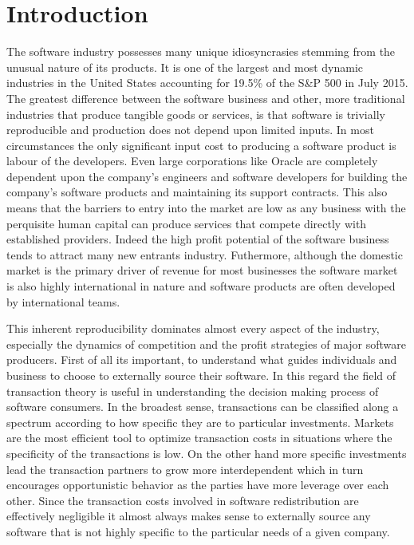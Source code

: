 \section*{Introduction}

The software industry possesses many unique idiosyncrasies stemming from the unusual nature of its products.
It is one of the largest and most dynamic industries in the United States accounting for 19.5\% of the S\&P 500 in July 2015.\autocite[6]{SurveysSoftware2015}
The greatest difference between the software business and other, more traditional industries that produce tangible goods or services, is that software is trivially reproducible and production does not depend upon limited inputs.\autocite[3]{buxmann2012software}
In most circumstances the only significant input cost to producing a software product is labour of the developers.
Even large corporations like Oracle are completely dependent upon the company's engineers and software developers for building the company's software products and maintaining its support contracts.\autocite[115]{finkle2012larry}
This also means that the barriers to entry into the market are low as any business with the perquisite human capital can produce services that compete directly with established providers.\autocite[115]{finkle2012larry}
Indeed the high profit potential of the software business tends to attract many new entrants industry.\autocite[116]{finkle2012larry}
Futhermore, although the domestic market is the primary driver of revenue for most businesses\autocite[]{ITSoftwareEconomist} the software market is also highly international in nature and software products are often developed by international teams.\autocite[3]{buxmann2012software}

This inherent reproducibility dominates almost every aspect of the industry, especially the dynamics of competition and the profit strategies of major software producers.
First of all its important, to understand what guides individuals and business to choose to externally source their software.
In this regard the field of transaction theory is useful in understanding the decision making process of software consumers.
In the broadest sense, transactions can be classified along a spectrum according to how specific they are to particular investments.
Markets are the most efficient tool to optimize transaction costs in situations where the specificity of the transactions is low.
On the other hand more specific investments lead the transaction partners to grow more interdependent which in turn encourages opportunistic behavior as the parties have more leverage over each other.\autocite[44]{buxmann2012software}
Since the transaction costs involved in software redistribution are effectively negligible it almost always makes sense to externally source any software that is not highly specific to the particular needs of a given company.

